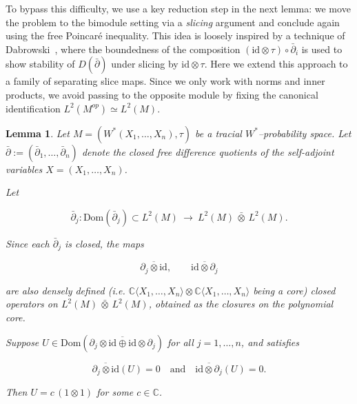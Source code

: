 \documentclass[10pt,a4paper,reqno]{amsart}
\newtheorem{lemma}[theorem]{Lemma}
\newcommand{\C}{\mathbb{C}}
\newcommand{\Dom}{\mathrm{Dom}}
\begin{document}
\begin{flushleft}
To bypass this difficulty, we use a key reduction step in the next lemma: we move the problem to the bimodule setting via a \emph{slicing} argument and conclude again using the free Poincaré inequality. This idea is loosely inspired by a technique of Dabrowski~\cite[Proof of Lemma~19(ii)]{Dab14}, where the boundedness of the composition $(\mathrm{id}\otimes\tau)\circ\bar\partial_i$ is used to show stability of $D(\bar\partial)$ under slicing by $\mathrm{id}\otimes \tau$. Here we extend this approach to a family of separating slice maps. Since we only work with norms and inner products, we avoid passing to the opposite module by fixing the canonical identification $L^2(M^{op})\simeq L^2(M)$.
\end{flushleft}


\begin{lemma}\label{lem:kernel-scalar-L2}
Let $M=(W^*(X_1,\ldots,X_n),\tau)$ be a tracial $W^\ast$--probability space. Let $\bar{\partial}:=(\bar{\partial}_1,\ldots,\bar{\partial}_n)$
denote the closed free difference quotients of the self-adjoint variables $X=(X_1,\ldots,X_n)$.

Let


\[
\bar\partial_j:\Dom(\bar\partial_j)\subset L^2(M)\ \longrightarrow\ L^2(M)\,\bar\otimes\,L^2(M).
\]



Since each $\bar\partial_j$ is closed, the maps


\[
\overline{\partial_j\otimes \mathrm{id}},\qquad \overline{\mathrm{id}\otimes \partial_j}
\]


are also densely defined (i.e. $\mathbb{C}\langle X_1,\ldots,X_n\rangle \otimes \mathbb{C}\langle X_1,\ldots,X_n\rangle$ being a core) closed operators on $L^2(M)\,\bar\otimes\,L^2(M)$, obtained as the closures on the polynomial core.

Suppose $U\in \Dom(\overline{\partial_j\otimes \mathrm{id}\oplus\mathrm{id}\otimes \partial_j})$ for all $j=1,\ldots,n$, and satisfies


\[
\overline{\partial_j\otimes \mathrm{id}}(U)=0
\quad\text{and}\quad
\overline{\mathrm{id}\otimes \partial_j}(U)=0.
\]


Then $U=c\,(1\otimes 1)$ for some $c\in\C$.
\end{lemma}
\end{document}
